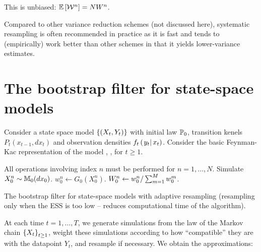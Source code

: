This is unbiased: $\mathbb{E}\left[\mathcal{W}^n\right] = NW^n$.

Compared to other variance reduction schemes (not discussed here), systematic resampling is often recommended in practice as it is fast and tends to (empirically) work better than other schemes in that it yields lower-variance estimates.

\section{The bootstrap filter for state-space models}

Consider a state space model $\left\{(X_t, Y_t)\right\}$ with initial law $\mathbb{P}_0$, transition kenels $P_t(x_{t-1}, dx_t)$ and observation densities $f_t\left(\left. y_t \right| x_t \right)$. Consider the basic Feynman-Kac representation of the model , , for $t \geq 1$.

\begin{algorithm}[ht]
  \DontPrintSemicolon
  All operations involving index $n$ must be performed for $n=1, \dots, N$. \;
  Simulate $X_0^n \sim \mathbb{M}_0(dx_0)$. \;
  $w_0^n \leftarrow G_0(X_0^n)$. \;
  $W_0^n \leftarrow w_0^n / \sum_{m=1}^{M} w_0^m$. \;
  \caption{The bootstrap filter for state-space models with adaptive resampling (resampling only when the ESS is too low -- reduces computational time of the algorithm).}
\end{algorithm}

At each time $t=1, \dots, T$, we generate simulations from the law of the Markov chain $\left\{X_t\right\}_{t \geq 1}$, weight these simulations according to how ``compatible'' they are with the datapoint $Y_t$, and resample if necessary. We obtain the approximations:

